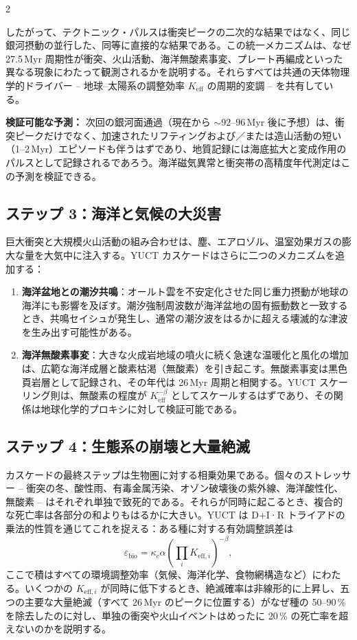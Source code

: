 \documentclass[12pt,a4paper]{article}
\begin{document}
	\begin{multicols}{2}
		
		したがって、テクトニック・パルスは衝突ピークの二次的な結果ではなく、同じ銀河摂動の並行した、同等に直接的な結果である。この統一メカニズムは、なぜ 27.5 Myr 周期性が衝突、火山活動、海洋無酸素事変、プレート再編成といった異なる現象にわたって観測されるかを説明する。それらすべては共通の天体物理学的ドライバー – 地球–太陽系の調整効率 \(K_{\mathrm{eff}}\) の周期的変調 – を共有している。
		
		\vspace{0.2cm}
		\noindent
		\textbf{検証可能な予測：} 次回の銀河面通過（現在から \(\sim 92\)–\(96\) Myr 後に予想）は、衝突ピークだけでなく、加速されたリフティングおよび／または造山活動の短い（1–2 Myr）エピソードも伴うはずであり、地質記録には海底拡大と変成作用のパルスとして記録されるであろう。海洋磁気異常と衝突帯の高精度年代測定はこの予測を検証できる。
		
		\subsection{ステップ 3：海洋と気候の大災害}
		巨大衝突と大規模火山活動の組み合わせは、塵、エアロゾル、温室効果ガスの膨大な量を大気中に注入する。YUCT カスケードはさらに二つのメカニズムを追加する：
		\begin{enumerate}
			\item \textbf{海洋盆地との潮汐共鳴}：オールト雲を不安定化させた同じ重力摂動が地球の海洋にも影響を及ぼす。潮汐強制周波数が海洋盆地の固有振動数と一致するとき、共鳴セイシュが発生し、通常の潮汐波をはるかに超える壊滅的な津波を生み出す可能性がある。
			\item \textbf{海洋無酸素事変}：大きな火成岩地域の噴火に続く急速な温暖化と風化の増加は、広範な海洋成層と酸素枯渇（無酸素）を引き起こす。無酸素事変は黒色頁岩層として記録され、その年代は 26 Myr 周期と相関する。YUCT スケーリング則は、無酸素の程度が \(K_{\mathrm{eff}}^{-\beta}\) としてスケールするはずであり、その関係は地球化学的プロキシに対して検証可能である。
		\end{enumerate}
		
		\subsection{ステップ 4：生態系の崩壊と大量絶滅}
		カスケードの最終ステップは生物圏に対する相乗効果である。個々のストレッサー – 衝突の冬、酸性雨、有毒金属汚染、オゾン破壊後の紫外線、海洋酸性化、無酸素 – はそれぞれ単独で致死的である。それらが同時に起こるとき、複合的な死亡率は各部分の和よりもはるかに大きい。YUCT は D+I·R トライアドの乗法的性質を通じてこれを捉える：ある種に対する有効調整誤差は
		\[
		\varepsilon_{\text{bio}} = \kappa_c \alpha \left( \prod_{i} K_{\mathrm{eff},i} \right)^{-\beta},
		\]
		ここで積はすべての環境調整効率（気候、海洋化学、食物網構造など）にわたる。いくつかの \(K_{\mathrm{eff},i}\) が同時に低下するとき、絶滅確率は非線形的に上昇し、五つの主要な大量絶滅（すべて 26 Myr のピークに位置する）がなぜ種の 50–90 \% を除去したのに対し、単独の衝突や火山イベントはめったに 20 \% の死亡率を超えないのかを説明する。
		
	\end{multicols}
	
\end{document}
